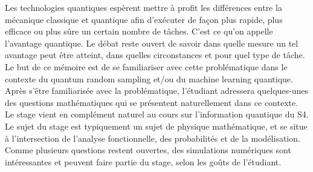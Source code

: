 Les technologies quantiques espèrent mettre à profit les différences entre la mécanique classique et quantique afin d'exécuter de façon plus rapide, plus efficace ou plus sûre un certain nombre de tâches. C'est ce qu'on appelle l'avantage quantique. Le débat reste ouvert de savoir dans quelle mesure un tel avantage peut être atteint, dans quelles circonstances et pour quel type de tâche. Le but de ce mémoire est de se familiariser avec cette problématique dans le contexte du quantum random sampling et/ou du machine learning quantique. \\

Après s'être familiarisée avec la problématique, l'étudiant adressera quelques-unes des questions mathématiques qui se présentent naturellement dans ce contexte. Le stage vient en complément naturel au cours sur l'information quantique du S4.\\ 

Le sujet du stage est typiquement un sujet de physique mathématique, et se situe à l'intersection de l'analyse fonctionnelle, des probabilités et de la modélisation. Comme plusieurs questions restent ouvertes, des simulations numériques sont intéressantes et peuvent faire partie du stage, selon les goûts de l'étudiant.
